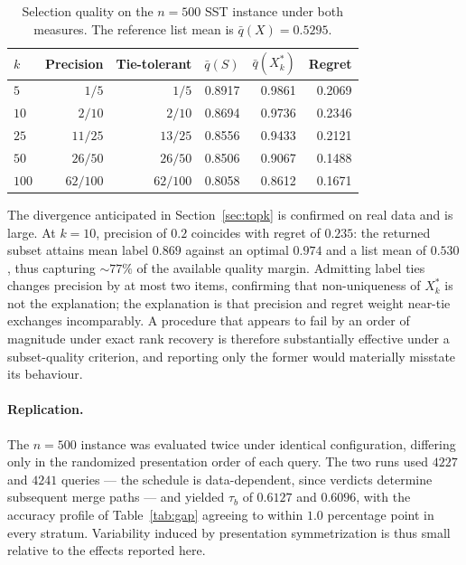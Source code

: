 \documentclass[11pt,a4paper]{article}
\begin{document}
\begin{table}[h]
\centering
\begin{tabular}{lrrrrr}
\toprule
$k$ & Precision & Tie-tolerant & $\bar q(S)$ & $\bar q(X_k^{*})$ & Regret \\
\midrule
$5$   & $1/5$    & $1/5$    & 0.8917 & 0.9861 & 0.2069 \\
$10$  & $2/10$   & $2/10$   & 0.8694 & 0.9736 & 0.2346 \\
$25$  & $11/25$  & $13/25$  & 0.8556 & 0.9433 & 0.2121 \\
$50$  & $26/50$  & $26/50$  & 0.8506 & 0.9067 & 0.1488 \\
$100$ & $62/100$ & $62/100$ & 0.8058 & 0.8612 & 0.1671 \\
\bottomrule
\end{tabular}
\caption{Selection quality on the $n=500$ SST instance under both measures.
The reference list mean is $\bar q(X) = 0.5295$.}
\label{tab:sstregret}
\end{table}

The divergence anticipated in Section~\ref{sec:topk} is confirmed on real data
and is large. At $k = 10$, precision of $0.2$ coincides with regret of $0.235$:
the returned subset attains mean label $0.869$ against an optimal $0.974$ and a
list mean of $0.530$, thus capturing ${\sim}77\%$ of the available quality margin.
Admitting label ties changes precision by at most two items, confirming that
non-uniqueness of $X_k^{*}$ is not the explanation; the explanation is that
precision and regret weight near-tie exchanges incomparably. A procedure that
appears to fail by an order of magnitude under exact rank recovery is therefore
substantially effective under a subset-quality criterion, and reporting only the
former would materially misstate its behaviour.

\paragraph{Replication.}
The $n=500$ instance was evaluated twice under identical configuration, differing
only in the randomized presentation order of each query. The two runs used
$4227$ and $4241$ queries --- the schedule is data-dependent, since verdicts
determine subsequent merge paths --- and yielded $\tau_b$ of $0.6127$ and
$0.6096$, with the accuracy profile of Table~\ref{tab:gap} agreeing to within
$1.0$ percentage point in every stratum. Variability induced by presentation
symmetrization is thus small relative to the effects reported here.
\end{document}
